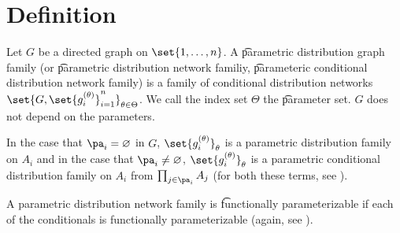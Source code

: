 
\section*{Definition}

Let $G$ be a directed graph on $\set{1,\dots , n}$.
A \t{parametric distribution graph family} (or \t{parametric distribution network familiy}, \t{parameteric conditional distribution network family}) is a family of conditional distribution networks $\set{G, \set{g_i^{(\theta )}}_{i=1}^{n}}_{\theta  \in \Theta }$.
We call the index set $\Theta $ the \t{parameter set}.
$G$ does not depend on the parameters.

In the case that $\pa_i = \varnothing$ in $G$, $\set{g_i^{(\theta )}}_\theta $ is a parametric distribution family on $A_i$ and in the case that $\pa_i \neq \varnothing$, $\set{g_i^{(\theta )}}_{\theta }$ is a parametric conditional distribution family on $A_i$ from $\prod_{j \in \pa_{i}} A_j$ (for both these terms, see ).

A parametric distribution network family is \t{functionally parameterizable} if each of the conditionals is functionally parameterizable (again, see ).

\blankpage